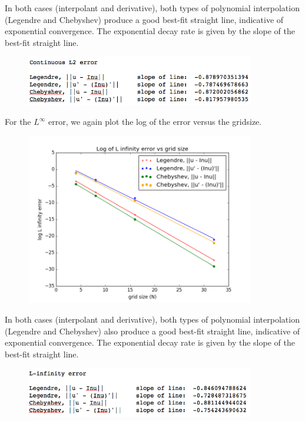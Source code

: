 \documentclass[12pt]{article}
\begin{document}
In both cases (interpolant and derivative), both types of polynomial interpolation (Legendre and Chebyshev) produce a good best-fit straight line, indicative of exponential convergence. The exponential decay rate is given by the slope of the best-fit straight line.

\begin{figure}[H]
\includegraphics[width=10cm]{images/L2slopes.png}
\end{figure}

For the $L^\infty$ error, we again plot the log of the error versus the gridsize. 

\begin{figure}[H]
\includegraphics[width=10cm]{images/polyLinferror.png}
\end{figure}

In both cases (interpolant and derivative), both types of polynomial interpolation (Legendre and Chebyshev) also produce a good best-fit straight line, indicative of exponential convergence. The exponential decay rate is given by the slope of the best-fit straight line.

\begin{figure}[H]
\includegraphics[width=10cm]{images/Linfslopes}
\end{figure}
\end{document}
